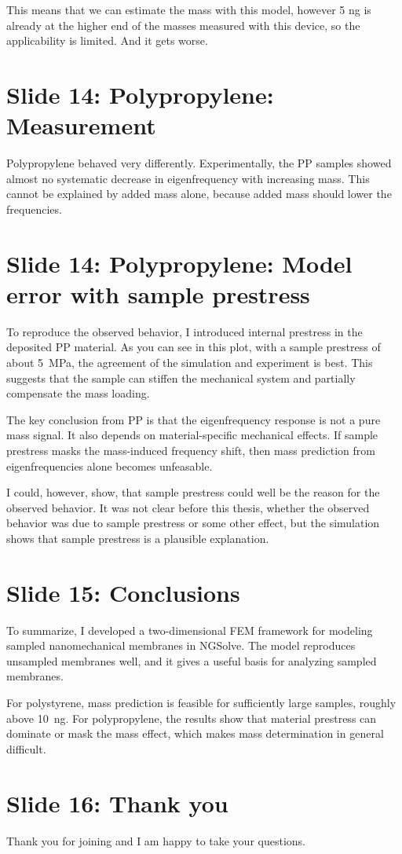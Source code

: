 \documentclass[11pt,a4paper]{article}
\begin{document}
This means that we can estimate the mass with this model, however 5 ng is already at the higher end of the masses measured with this device, so the applicability is limited. And it gets worse.

\section*{Slide 14: Polypropylene: Measurement}

Polypropylene behaved very differently. Experimentally, the PP samples showed almost no systematic decrease in eigenfrequency with increasing mass. This cannot be explained by added mass alone, because added mass should lower the frequencies.

\section*{Slide 14: Polypropylene: Model error with sample prestress}

To reproduce the observed behavior, I introduced internal prestress in the deposited PP material. As you can see in this plot, with a sample prestress of about \SI{5}{\mega\pascal}, the agreement of the simulation and experiment is best. This suggests that the sample can stiffen the mechanical system and partially compensate the mass loading.

The key conclusion from PP is that the eigenfrequency response is not a pure mass signal. It also depends on material-specific mechanical effects. If sample prestress masks the mass-induced frequency shift, then mass prediction from eigenfrequencies alone becomes unfeasable.

I could, however, show, that sample prestress could well be the reason for the observed behavior. It was not clear before this thesis, whether the observed behavior was due to sample prestress or some other effect, but the simulation shows that sample prestress is a plausible explanation.


\section*{Slide 15: Conclusions}

To summarize, I developed a two-dimensional FEM framework for modeling sampled nanomechanical membranes in NGSolve. The model reproduces unsampled membranes well, and it gives a useful basis for analyzing sampled membranes.

For polystyrene, mass prediction is feasible for sufficiently large samples, roughly above \SI{10}{\nano\gram}. For polypropylene, the results show that material prestress can dominate or mask the mass effect, which makes mass determination in general difficult.


\section*{Slide 16: Thank you}

Thank you for joining and I am happy to take your questions.
\end{document}
